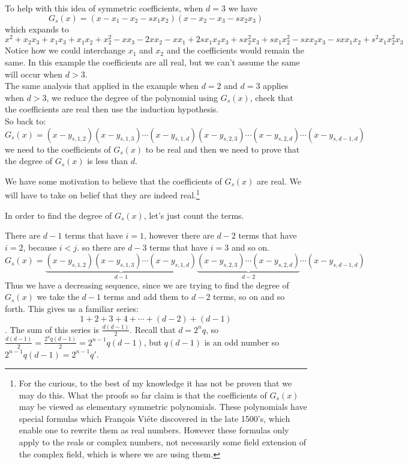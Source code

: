 \documentclass[12pt]{article}
\begin{document}
To help with this idea of symmetric coefficients, when $d=3$ we have
$$
G_s(x) = (x-x_1-x_2-sx_1x_2)(x-x_2-x_3-sx_2x_3)
$$
which expands to
$$
x^2+x_2x_3+x_1x_3 + x_1x_2 + x_2^2 -xx_3 - 2x x_2-x x_1 + 2sx_1x_2x_3 + sx_2^2 x_3 + s x_1 x_2^2 - s x x_2 x_3 - s x x_1 x_2 + s^2 x_1 x_2^2 x_3
$$
Notice how we could interchange $x_1$ and $x_2$ and the coefficients would remain the same.  In this example the coefficients are all real, but we can't assume the same will occur when $d>3$.\\

The same analysis that applied in the example when $d=2$ and $d=3$ applies when $d>3$, we reduce the degree of the polynomial using $G_s(x)$, check that the coefficients are real then use the induction hypothesis.\\

So back to:
$$ G_s(x) =(x-y_{s,1,2})(x-y_{s,1,3})\cdots(x-y_{s,1,d})(x-y_{s,2,3})\cdots (x-y_{s,2,d})\cdots (x-y_{s,d-1,d})$$
we need to the coefficients of $G_s(x)$ to be real and then we need to prove that the degree of $G_s(x)$ is less than $d$.

We have some motivation to believe that the coefficients of $G_s(x)$ are real.  We will have to take on belief that they are indeed real.\footnote{For the curious, to the best of my knowledge it has not be proven that we may do this.  What the proofs so far claim is that the coefficients of $G_s(x)$ may be viewed as elementary symmetric polynomials.  These polynomials have special formulas which Fran\c{c}ois Vi\'ete discovered in the late 1500's, which enable one to rewrite them as real numbers.  However these formulas only apply to the reals or complex numbers, not necessarily some field extension of the complex field, which is where we are using them.}  


In order to find the degree of $G_s(x)$, let's just count the terms.

There are $d-1$ terms that have $i=1$, however there are $d-2$ terms that have $i=2$, because $i<j$.  so there are $d-3$ terms that have $i=3$ and so on.
$$ G_s(x) =\underbrace{(x-y_{s,1,2})(x-y_{s,1,3})\cdots(x-y_{s,1,d})}_{d-1} \underbrace{(x-y_{s,2,3})\cdots (x-y_{s,2,d})}_{d-2} \cdots (x-y_{s,d-1,d})$$
Thus we have a decreasing sequence, since we are trying to find the degree of $G_s(x)$ we take the $d-1$ terms and add them to $d-2$ terms, so on and so forth.  This gives us a familiar series:
$$ 1 + 2 + 3 + 4 + \cdots + (d-2) + (d-1)$$.
The sum of this series is $\frac{d(d-1)}{2}$.  Recall that $d=2^n q$, so $\frac{d(d-1)}{2} = \frac{2^n q (d-1)}{2} = 2^{n-1}q(d-1)$, but $q(d-1)$ is an odd number so $2^{n-1}q(d-1) = 2^{n-1}q'$.  
\end{document}
